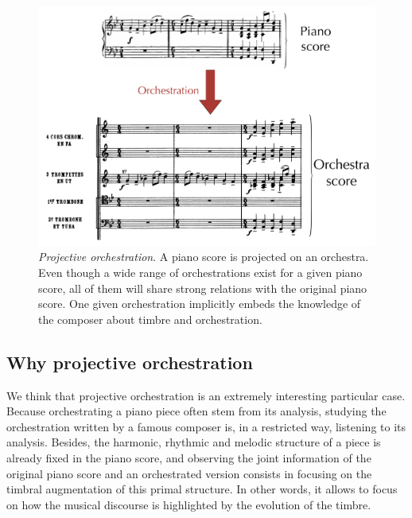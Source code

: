 \documentclass[twoside,twocolumn]{article}
\begin{document}
\begin{figure}
\centering
\includegraphics[scale=0.12]{orch}
\caption{\textit{Projective orchestration}. A piano score is projected on an orchestra. Even though a wide range of orchestrations exist for a given piano score, all of them will share strong relations with the original piano score. One given orchestration implicitly embeds the knowledge of the composer about timbre and orchestration.}
\label{fig:orch}
\end{figure}

\subsection{Why projective orchestration}
We think that projective orchestration is an extremely interesting particular case. Because orchestrating a piano piece often stem from its analysis, studying the orchestration written by a famous composer is, in a restricted way, listening to its analysis. Besides, the harmonic, rhythmic and melodic structure of a piece is already fixed in the piano score, and observing the joint information of the original piano score and an orchestrated version consists in focusing on the timbral augmentation of this primal structure. In other words, it allows to focus on how the musical discourse is highlighted by the evolution of the timbre.
\end{document}
